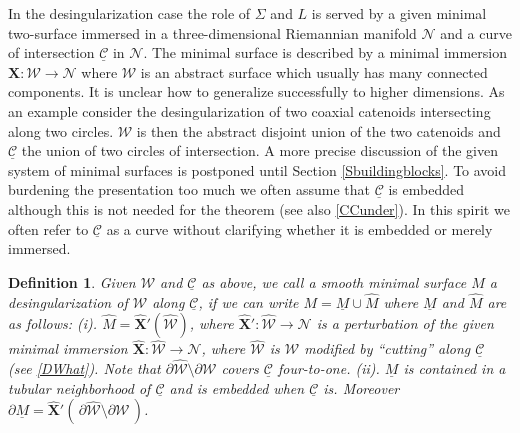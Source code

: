 \documentclass[12pt,namelimits,sumlimits]{amsart}
\newtheorem{definition}[theorem]{Definition}
\theoremstyle{remark}
\numberwithin{equation}{section}
\begin{document}
In the desingularization case the role of $\Sigma$ and $L$ is served
by a given minimal two-surface 
immersed in a three-dimensional Riemannian manifold ${{\mathcal{N}}}$
and a curve of intersection ${\underline{{\mathcal{C}}}}$ in ${{\mathcal{N}}}$.
The minimal surface is described
by a minimal immersion ${\boldsymbol{X}}:{{\mathcal{W}}}\to{{\mathcal{N}}}$
where ${{\mathcal{W}}}$ is an abstract surface which 
usually has many connected components.
It is unclear how to generalize successfully to higher dimensions.
As an example consider the desingularization of two coaxial catenoids 
intersecting along two circles.
${{\mathcal{W}}}$ is then the abstract disjoint union of the two catenoids
and ${\underline{{\mathcal{C}}}}$ the union of two circles of intersection.
A more precise discussion of the given system of minimal surfaces is postponed until Section \ref{Sbuildingblocks}.
To avoid burdening the presentation too much we often assume that ${\underline{{\mathcal{C}}}}$ is embedded
although this is not needed for the theorem (see also \ref{CCunder}).
In this spirit
we often refer to ${\underline{{\mathcal{C}}}}$ as a curve without clarifying whether it is embedded or merely immersed.

\addtocounter{equation}{1}
\begin{definition}
\label{Ddesingularization}
Given ${{\mathcal{W}}}$ and ${\underline{{\mathcal{C}}}}$ as above,
we call a smooth minimal surface $M$ a desingularization of ${{\mathcal{W}}}$ along ${\underline{{\mathcal{C}}}}$,
if we can write $M=\underline{M}\cup\widehat{M}$ where 
$\underline{M}$ and $\widehat{M}$ are as follows:
\newline
(i).
$\widehat{M}={\widehat{\boldsymbol{X}}}'({{\widehat{{\mathcal{W}}}}})$,
where ${\widehat{\boldsymbol{X}}}':{{\widehat{{\mathcal{W}}}}}\to{{\mathcal{N}}}$ is a perturbation of
the given minimal immersion ${\widehat{\boldsymbol{X}}}:{{\widehat{{\mathcal{W}}}}}\to{{\mathcal{N}}}$,
where ${{\widehat{{\mathcal{W}}}}}$ is ${{\mathcal{W}}}$ modified by ``cutting'' along ${\underline{{\mathcal{C}}}}$ (see \ref{DWhat}).
Note that $\partial{{\widehat{{\mathcal{W}}}}}\setminus\partial{{\mathcal{W}}}$ covers ${\underline{{\mathcal{C}}}}$ four-to-one.
\newline
(ii).
$\underline{M}$ is contained in a tubular neighborhood of ${\underline{{\mathcal{C}}}}$
and is embedded when ${\underline{{\mathcal{C}}}}$ is.
Moreover
$\partial\underline{M}
=
{\widehat{\boldsymbol{X}}}'
(\,
\partial{{\widehat{{\mathcal{W}}}}}\setminus\partial{{\mathcal{W}}}
\,)$.
\end{definition}
\end{document}
